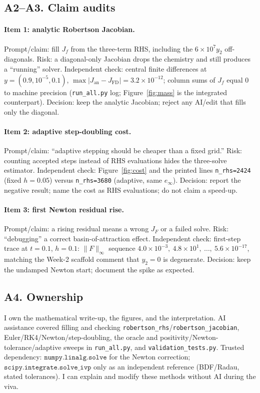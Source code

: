 \documentclass[11pt,a4paper]{article}
\begin{document}
\subsection{A2--A3. Claim audits}

\paragraph{Item 1: analytic Robertson Jacobian.}
Prompt/claim: fill \(J_f\) from the three-term RHS, including the \(6\times 10^7 y_2\) off-diagonals.
Risk: a diagonal-only Jacobian drops the chemistry and still produces a ``running'' solver.
Independent check: central finite differences at \(y=(0.9,10^{-5},0.1)\), \(\max|J_{\mathrm{an}}-J_{\mathrm{FD}}|=3.2\times 10^{-12}\); column sums of \(J_f\) equal \(0\) to machine precision (\texttt{run\_all.py} log; Figure~\ref{fig:mass} is the integrated counterpart).
Decision: keep the analytic Jacobian; reject any AI/edit that fills only the diagonal.

\paragraph{Item 2: adaptive step-doubling cost.}
Prompt/claim: ``adaptive stepping should be cheaper than a fixed grid.''
Risk: counting accepted steps instead of RHS evaluations hides the three-solve estimator.
Independent check: Figure~\ref{fig:cost} and the printed lines \texttt{n\_rhs=2424} (fixed \(h=0.05\)) versus \texttt{n\_rhs=3680} (adaptive, same \(e_\infty\)).
Decision: report the negative result; name the cost as RHS evaluations; do not claim a speed-up.

\paragraph{Item 3: first Newton residual rise.}
Prompt/claim: a rising residual means a wrong \(J_F\) or a failed solve.
Risk: ``debugging'' a correct basin-of-attraction effect.
Independent check: first-step trace at \(t=0.1\), \(h=0.1\): \(\|F\|_\infty\) sequence \(4.0\times 10^{-3},\ 4.8\times 10^{1},\ \ldots,\ 5.6\times 10^{-17}\), matching the Week-2 scaffold comment that \(y_2=0\) is degenerate.
Decision: keep the undamped Newton start; document the spike as expected.

\subsection{A4. Ownership}
I own the mathematical write-up, the figures, and the interpretation. AI assistance covered filling and checking \texttt{robertson\_rhs}/\texttt{robertson\_jacobian}, Euler/RK4/Newton/step-doubling, the oracle and positivity/Newton-tolerance/adaptive sweeps in \texttt{run\_all.py}, and \texttt{validation\_tests.py}.
Trusted dependency: \(\mathtt{numpy.linalg.solve}\) for the Newton correction; \(\mathtt{scipy.integrate.solve\_ivp}\) only as an independent reference (BDF/Radau, stated tolerances). I can explain and modify these methods without AI during the viva.
\end{document}
